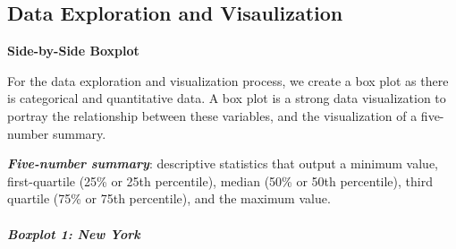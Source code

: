 \documentclass[
]{article}
\newenvironment{Shaded}{\begin{snugshade}}{\end{snugshade}}
\newcommand{\FunctionTok}[1]{\textcolor[rgb]{0.13,0.29,0.53}{\textbf{#1}}}
\newcommand{\NormalTok}[1]{#1}
\newcommand{\OtherTok}[1]{\textcolor[rgb]{0.56,0.35,0.01}{#1}}
\newcommand{\SpecialCharTok}[1]{\textcolor[rgb]{0.81,0.36,0.00}{\textbf{#1}}}
\newcommand{\StringTok}[1]{\textcolor[rgb]{0.31,0.60,0.02}{#1}}
\begin{document}
\begin{Shaded}
\end{Shaded}

\hypertarget{data-exploration-and-visaulization}{%
\subsection{Data Exploration and
Visaulization}\label{data-exploration-and-visaulization}}

\textbf{Side-by-Side Boxplot}

For the data exploration and visualization process, we create a box plot
as there is categorical and quantitative data. A box plot is a strong
data visualization to portray the relationship between these variables,
and the visualization of a five-number summary.

\textbf{\emph{Five-number summary}}: descriptive statistics that output
a minimum value, first-quartile (25\% or 25th percentile), median (50\%
or 50th percentile), third quartile (75\% or 75th percentile), and the
maximum value.

\hypertarget{boxplot-1-new-york}{%
\subparagraph{Boxplot 1: New York}\label{boxplot-1-new-york}}
\end{document}
